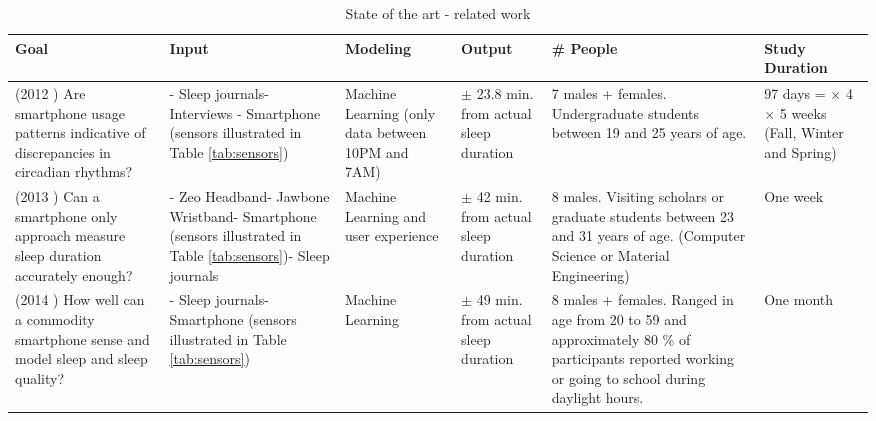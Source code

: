 \documentclass[12pt]{article} %
\begin{document}
\begin{table}%
\center
\begin{footnotesize}
	\begin{tabular}{|p{2.2cm} |p{2.5cm} |p{2cm} |p{2.1cm} |p{2.8cm} |p{1.8cm} |}
	\hline
	\textbf{Goal} & \textbf{Input} & \textbf{Modeling} & \textbf{Output} & \textbf{\# People} & \textbf{Study Duration}\\
	\hline
	\hline
	(2012 \cite{beWell}) Are smartphone usage patterns indicative of discrepancies in circadian rhythms? & - Sleep journals\newline - Interviews \newline - Smartphone \newline(sensors illustrated in Table \ref{tab:sensors})  & Machine Learning (only data between 10PM and 7AM) & $\pm$ 23.8 min. from actual \newline sleep \newline duration & 7 males + \newline 2 females. \newline Undergraduate students between 19 and 25 years of age. & 97 days = \newline 5 $\times$ 4 $\times$ 5 weeks (Fall, Winter and Spring)\\
	\hline
	(2013 \cite{compare}) Can a smartphone only approach measure sleep duration accurately enough? & - Zeo Headband\newline - Jawbone \newline Wristband\newline - Smartphone \newline(sensors illustrated in Table \ref{tab:sensors})\newline - Sleep journals & Machine Learning and user experience & $\pm$ 42 min. from actual \newline sleep \newline duration & 8 males. \newline Visiting scholars or graduate students between 23 and 31 years of age. (Computer Science or Material Engineering) & One week \\
	\hline
	(2014 \cite{toss}) How well can a commodity smartphone sense and model sleep and sleep quality? & - Sleep journals\newline - Smartphone \newline(sensors illustrated in Table \ref{tab:sensors}) & Machine Learning & $\pm$ 49 min. from  actual \newline sleep \newline duration & 8 males + \newline 19 females. \newline Ranged in age from 20 to 59 and approximately 80 \% of participants reported working or going to school during daylight hours. & One month \\
	\hline 
	\end{tabular}
	\caption{State of the art - related work}
	\label{tab:tableApproach}
\end{footnotesize}
\end{table}
\end{document}
